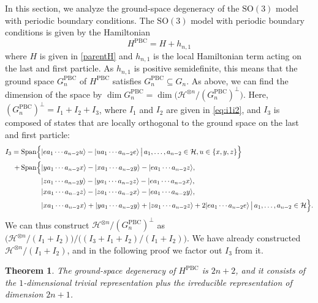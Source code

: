 \documentclass[a4paper]{article}
\newcommand{\ket}[1]{\vert #1 \rangle}
\newcommand{\Span}{\mathrm{Span}}
\newcommand{\SO}{\mathrm{SO}}
\newtheorem{theorem}{Theorem}
\theoremstyle{definition}
\begin{document}
In this section, we analyze the ground-space degeneracy of the $\SO(3)$ model with periodic boundary conditions. The $\SO(3)$ model with periodic boundary conditions is given by the Hamiltonian 
\begin{equation}
    H^\mathrm{PBC} = H + h_{n,1}
\end{equation}
where $H$ is given in \cref{parentH} and $h_{n,1}$ is the local Hamiltonian term acting on the last and first particle. As $h_{n,1}$ is positive semidefinite, this means that the ground space $G_n^\mathrm{PBC}$ of $H^\mathrm{PBC}$ satisfies $G_n^\mathrm{PBC} \subseteq G_n$. As above, we can find the dimension of the space by $\dim G_n^\mathrm{PBC} = \dim \big(\mathcal{H}^{\otimes n} / (G_n^\mathrm{PBC})^\perp\big)$. Here, $(G_n^\mathrm{PBC})^\perp = I_1 + I_2 + I_3$, where $I_1$ and $I_2$ are given in \cref{eq:i1i2}, and $I_3$ is composed of states that are locally orthogonal to the ground space on the last and first particle: 
\begin{align*}
    I_3 = \Span \Bigl\{& \ket{e a_1 \cdots a_{n-2} u} - \ket{ua_1 \cdots a_{n-2} e} \,\big|\, a_1, \dots, a_{n-2} \in \mathcal{H}, u\in \{x,y,z\} \Bigr\} \\
    + \,\Span \Bigl\{& \ket{y a_1 \cdots a_{n-2} x} - \ket{xa_1 \cdots a_{n-2} y } - \ket{e a_1 \cdots a_{n-2} z}, \\
&  \ket{z a_1 \cdots a_{n-2} y} - \ket{ya_1 \cdots a_{n-2} z } - \ket{e a_1 \cdots a_{n-2} x}, \\
&   \ket{x a_1 \cdots a_{n-2} z} - \ket{za_1 \cdots a_{n-2} x } - \ket{e a_1 \cdots a_{n-2} y}, \\
&   \ket{x a_1 \cdots a_{n-2} x} + \ket{ya_1 \cdots a_{n-2} y } + \ket{z a_1 \cdots a_{n-2} z} + 2\ket{e a_1 \cdots a_{n-2} e} \,\big|\, a_1, \dots, a_{n-2} \in \mathcal{H} \Bigr\}.
\end{align*}
We can thus construct $\mathcal{H}^{\otimes n} / (G_n^\mathrm{PBC})^\perp$ as $\bigl(\mathcal{H}^{\otimes n}/ (I_1 +I_2)\bigr)\big/\bigl((I_3 + I_1 + I_2)/(I_1+I_2)\bigr)$. We have already constructed $\mathcal{H}^{\otimes n}/ (I_1 +I_2)$, and in the following proof we factor out $I_3$ from it.

\begin{theorem}
    \label{thm:pbc-gs-structure}
    The ground-space degeneracy of $H^\mathrm{PBC}$ is $2n+2$, and it consists of the $1$-dimensional trivial representation plus the irreducible representation of dimension $2n+1$.
\end{theorem}
\end{document}
